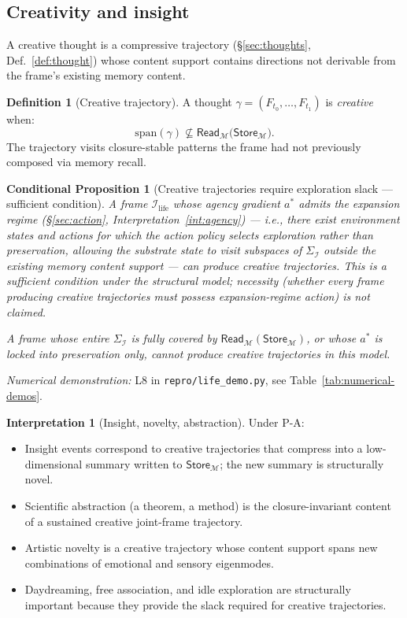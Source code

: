 \documentclass[11pt]{article}
\theoremstyle{plain}
\newtheorem{conditional}[theorem]{Conditional Proposition}
\theoremstyle{definition}
\newtheorem{definition}[theorem]{Definition}
\newtheorem{interpretation}[theorem]{Interpretation}
\theoremstyle{remark}
\newcommand{\Ical}{\mathcal{I}}
\newcommand{\Mcal}{\mathcal{M}}
\newcommand{\Ilife}{\Ical_{\mathrm{life}}}
\begin{document}
\subsection{Creativity and insight}\label{sec:creativity}

A creative thought is a compressive trajectory (\S\ref{sec:thoughts}, Def.~\ref{def:thought}) whose content support contains directions not derivable from the frame's existing memory content.

\begin{definition}[Creative trajectory]\label{def:creativity}
A thought $\gamma = (F_{t_0}, \ldots, F_{t_1})$ is \emph{creative} when:
\[
  \mathrm{span}(\gamma) \not\subseteq \mathsf{Read}_\Mcal\big(\mathsf{Store}_\Mcal\big).
\]
The trajectory visits closure-stable patterns the frame had not previously composed via memory recall.
\end{definition}

\begin{conditional}[Creative trajectories require exploration slack --- sufficient condition]\label{thm:creativity-slack}
A frame $\Ilife$ whose agency gradient $a^*$ admits the expansion regime (\S\ref{sec:action}, Interpretation~\ref{int:agency}) --- i.e., there exist environment states and actions for which the action policy selects exploration rather than preservation, allowing the substrate state to visit subspaces of $\Sigma_\Ical$ outside the existing memory content support --- can produce creative trajectories. This is a sufficient condition under the structural model; necessity (whether every frame producing creative trajectories must possess expansion-regime action) is not claimed.

A frame whose entire $\Sigma_\Ical$ is fully covered by $\mathsf{Read}_\Mcal(\mathsf{Store}_\Mcal)$, or whose $a^*$ is locked into preservation only, cannot produce creative trajectories in this model.
\end{conditional}

\noindent\emph{Numerical demonstration:} L8 in \texttt{repro/life\_demo.py}, see Table~\ref{tab:numerical-demos}.


\begin{interpretation}[Insight, novelty, abstraction]\label{int:creativity}
Under P-A:
\begin{itemize}[leftmargin=2em]
\item Insight events correspond to creative trajectories that compress into a low-dimensional summary written to $\mathsf{Store}_\Mcal$; the new summary is structurally novel.
\item Scientific abstraction (a theorem, a method) is the closure-invariant content of a sustained creative joint-frame trajectory.
\item Artistic novelty is a creative trajectory whose content support spans new combinations of emotional and sensory eigenmodes.
\item Daydreaming, free association, and idle exploration are structurally important because they provide the slack required for creative trajectories.
\end{itemize}
\end{interpretation}
\end{document}
